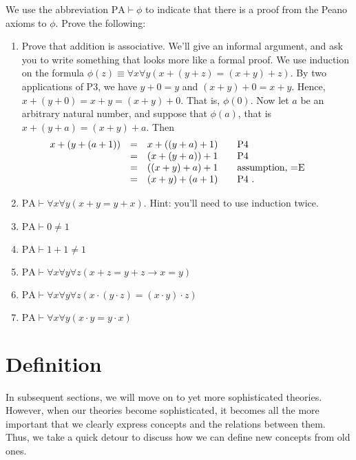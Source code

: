 \begin{exercises} We use the abbreviation $\text{PA}\vdash\phi$ to
  indicate that there is a proof from the Peano axioms to $\phi$.
  Prove the following:
  \begin{enumerate}
  \item Prove that addition is associative.  We'll give an informal
    argument, and ask you to write something that looks more like a
    formal proof.  We use induction on the formula
    $\phi (z)\equiv \forall x\forall y(x+(y+z)=(x+y)+z)$.  By two
    applications of P3, we have $y+0=y$ and $(x+y)+0=x+y$.  Hence,
    $x+(y+0)=x+y=(x+y)+0$.  That is, $\phi (0)$.  Now let $a$ be an
    arbitrary natural number, and suppose that $\phi (a)$, that is
    $x+(y+a)=(x+y)+a$.  Then
    \[ \begin{array}{r c l c p{3.2cm}}
         x+(y+(a+1)) & = & x+((y+a)+1) & & P4 \\
                     & = & (x+(y+a))+1 & & P4 \\
                     & = & ((x+y)+a)+1 & & assumption, $=$E \\
                     & = & (x+y)+(a+1) & & P4 . \end{array} \]
  \item $\text{PA}\vdash \forall x\forall y(x+y=y+x)$.  Hint: you'll need to use
    induction twice.
  \item $\text{PA}\vdash 0\neq 1$
  \item $\text{PA}\vdash 1+1\neq 1$
  \item $\text{PA}\vdash \forall x\forall y\forall z(x+z=y+z\to x=y)$
  \item $\text{PA}\vdash \forall x\forall y\forall z(x\cdot (y\cdot z)=(x\cdot
    y)\cdot z)$
  \item $\text{PA}\vdash \forall x\forall y(x\cdot y=y\cdot x)$
  \end{enumerate}
\end{exercises}



\section{Definition}

In subsequent sections, we will move on to yet more sophisticated
theories.  However, when our theories become sophisticated, it becomes
all the more important that we clearly express concepts and the
relations between them.  Thus, we take a quick detour to discuss how
we can define new concepts from old ones.


